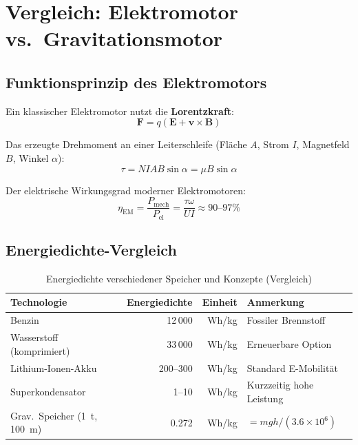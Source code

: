 ﻿\documentclass[12pt, a4paper]{report}
\theoremstyle{definition}
\theoremstyle{remark}
\newcommand{\vek}[1]{\boldsymbol{#1}}
\begin{document}
\chapter{Vergleich: Elektromotor vs.\ Gravitationsmotor}
\label{sec:vergleich}

\section{Funktionsprinzip des Elektromotors}

Ein klassischer Elektromotor nutzt die \textbf{Lorentzkraft}:
\begin{equation}
  \vek{F} = q(\vek{E} + \vek{v} \times \vek{B})
  \label{eq:lorentz}
\end{equation}

Das erzeugte Drehmoment an einer Leiterschleife (Fläche $A$, Strom $I$,
Magnetfeld $B$, Winkel $\alpha$):
\begin{equation}
  \tau = N I A B \sin\alpha = \mu B \sin\alpha
  \label{eq:em_drehmoment}
\end{equation}

Der elektrische Wirkungsgrad moderner Elektromotoren:
\begin{equation}
  \eta_{\text{EM}} = \frac{P_{\text{mech}}}{P_{\text{el}}} = \frac{\tau \omega}{U I} \approx 90\text{--}97\%
  \label{eq:em_wirk}
\end{equation}

\section{Energiedichte-Vergleich}

\begin{table}[H]
  \centering
  \caption{Energiedichte verschiedener Speicher und Konzepte (Vergleich)}
  \label{tab:energiedichte}
  \begin{tabular}{lrrl}
    \toprule
    \textbf{Technologie} & \textbf{Energiedichte} & \textbf{Einheit} & \textbf{Anmerkung} \\
    \midrule
    Benzin               & 12\,000          & Wh/kg   & Fossiler Brennstoff \\
    Wasserstoff (komprimiert) & 33\,000   & Wh/kg   & Erneuerbare Option \\
    Lithium-Ionen-Akku   & 200--300         & Wh/kg   & Standard E-Mobilität \\
    Superkondensator      & 1--10            & Wh/kg   & Kurzzeitig hohe Leistung \\
    Grav.\ Speicher (\SI{1}{\tonne}, \SI{100}{\metre}) & 0.272 & Wh/kg & $=mgh/(3.6\times10^6)$ \\
    \bottomrule
  \end{tabular}
\end{table}
\end{document}
